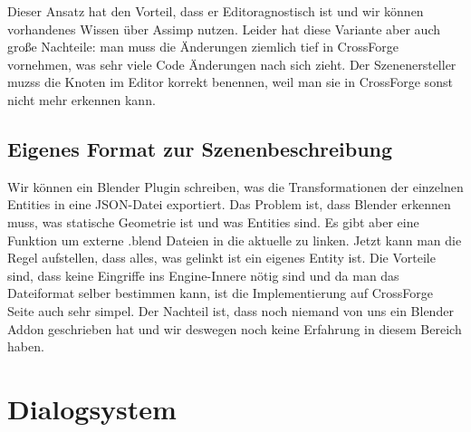 Dieser Ansatz hat den Vorteil, dass er Editoragnostisch ist und wir können vorhandenes Wissen über Assimp nutzen. Leider hat diese Variante aber auch große Nachteile: man muss die Änderungen ziemlich tief in CrossForge vornehmen, was sehr viele Code Änderungen nach sich zieht. Der Szenenersteller muzss die Knoten im Editor korrekt benennen, weil man sie in CrossForge sonst nicht mehr erkennen kann.

\subsection{Eigenes Format zur Szenenbeschreibung}

Wir können ein Blender Plugin schreiben, was die Transformationen der einzelnen Entities in eine JSON-Datei exportiert. Das Problem ist, dass Blender erkennen muss, was statische Geometrie ist und was Entities sind. Es gibt aber eine Funktion um externe .blend Dateien in die aktuelle zu linken. Jetzt kann man die Regel aufstellen, dass alles, was gelinkt ist ein eigenes Entity ist. Die Vorteile sind, dass keine Eingriffe ins Engine-Innere nötig sind und da man das Dateiformat selber bestimmen kann, ist die Implementierung auf CrossForge Seite auch sehr simpel. Der Nachteil ist, dass noch niemand von uns ein Blender Addon geschrieben hat und wir deswegen noch keine Erfahrung in diesem Bereich haben.

\section{Dialogsystem}
